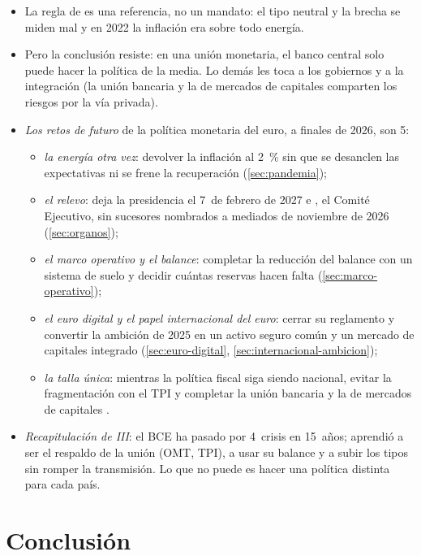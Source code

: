 \documentclass[11pt]{article}
\begin{document}
\begin{itemize}
\item La regla de  es una referencia, no un mandato: el tipo neutral y la brecha se miden mal y en 2022 la inflación era sobre todo energía.
\item Pero la conclusión resiste: en una unión monetaria, el banco central solo puede hacer la política de la media. Lo demás les toca a los gobiernos y a la integración (la unión bancaria y la de mercados de capitales comparten los riesgos por la vía privada).
\item \emph{Los retos de futuro} de la política monetaria del euro, a finales de 2026, son 5:
  \begin{itemize}
  \item \emph{la energía otra vez}: devolver la inflación al 2~\% sin que se desanclen las expectativas ni se frene la recuperación (\ref{sec:pandemia});
  \item \emph{el relevo}:  deja la presidencia el 7~de febrero de 2027 e , el Comité Ejecutivo, sin sucesores nombrados a mediados de noviembre de 2026 (\ref{sec:organos});
  \item \emph{el marco operativo y el balance}: completar la reducción del balance con un sistema de suelo y decidir cuántas reservas hacen falta (\ref{sec:marco-operativo});
  \item \emph{el euro digital y el papel internacional del euro}: cerrar su reglamento y convertir la ambición de 2025 en un activo seguro común y un mercado de capitales integrado (\ref{sec:euro-digital}, \ref{sec:internacional-ambicion});
  \item \emph{la talla única}: mientras la política fiscal siga siendo nacional, evitar la fragmentación con el TPI y completar la unión bancaria y la de mercados de capitales .
  \end{itemize}
\item \emph{Recapitulación de III}: el BCE ha pasado por 4~crisis en 15~años; aprendió a ser el respaldo de la unión (OMT, TPI), a usar su balance y a subir los tipos sin romper la transmisión. Lo que no puede es hacer una política distinta para cada país.
\end{itemize}

\section*{Conclusión}
\end{document}
